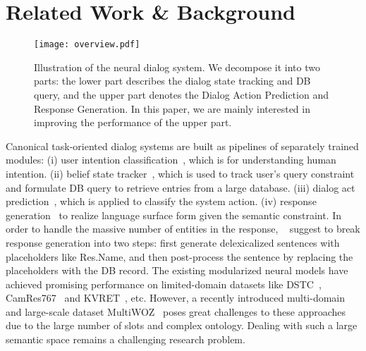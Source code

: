 \documentclass[11pt,a4paper]{article}
\begin{document}
\section{Related Work \& Background}
\begin{figure*}[thb]
\begin{center}
    \texttt{[image: overview.pdf]}
    \end{center}
    \caption{Illustration of the neural dialog system. We decompose it into two parts: the lower part describes the dialog state tracking and DB query, and the upper part denotes the Dialog Action Prediction and Response Generation. In this paper, we are mainly interested in improving the performance of the upper part. }
    \label{fig:overview}
\end{figure*}
Canonical task-oriented dialog systems are built as pipelines of separately trained modules: (i) user intention classification~\cite{DBLP:conf/naacl/ShiYTJ16,DBLP:conf/naacl/GooGHHCHC18}, which is for understanding human intention. (ii) belief state tracker~\cite{DBLP:conf/sigdial/WilliamsRRB13,DBLP:conf/acl/MrksicSWTY17,DBLP:journals/tacl/MrksicVSLRGKY17,zhong2018global,chen2018xl}, which is used to track user's query constraint and formulate DB query to retrieve entries from a large database. (iii) dialog act prediction~\cite{DBLP:conf/icml/WenMBY17}, which is applied to classify the system action. (iv) response generation~\cite{DBLP:conf/eacl/Rojas-BarahonaG17,DBLP:conf/naacl/WenGMRSVY16,DBLP:conf/ijcnlp/LiCLGC17,DBLP:conf/acl/KanHLJRY18} to realize language surface form given the semantic constraint. In order to handle the massive number of entities in the response, ~\citet{DBLP:conf/eacl/Rojas-BarahonaG17,DBLP:conf/naacl/WenGMRSVY16,DBLP:conf/emnlp/WenGMSVY15} suggest to break response generation into two steps: first generate delexicalized sentences with placeholders like Res.Name, and then post-process the sentence by replacing the placeholders with the DB record. The existing modularized neural models have achieved promising performance on  limited-domain datasets like DSTC~\cite{DBLP:journals/dad/WilliamsRH16a}, CamRes767~\cite{DBLP:conf/eacl/Rojas-BarahonaG17} and KVRET~\cite{DBLP:conf/sigdial/EricKCM17}, etc. However, a recently introduced multi-domain and large-scale dataset MultiWOZ~\cite{DBLP:conf/emnlp/BudzianowskiWTC18} poses great challenges to these approaches due to the large number of slots and complex ontology. Dealing with such a large semantic space remains a challenging research problem.
\end{document}
